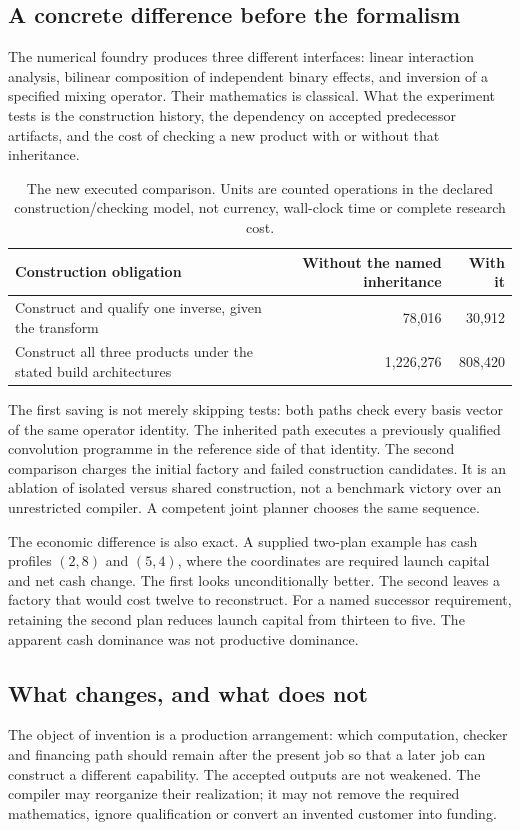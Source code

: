 \documentclass[11pt,letterpaper]{article}
\theoremstyle{definition}\newtheorem{definition}[theorem]{Definition}
\theoremstyle{remark}\newtheorem{remark}[theorem]{Remark}
\begin{document}
\subsection{A concrete difference before the formalism}
The numerical foundry produces three different interfaces: linear interaction analysis, bilinear composition of independent binary effects, and inversion of a specified mixing operator. Their mathematics is classical. What the experiment tests is the construction history, the dependency on accepted predecessor artifacts, and the cost of checking a new product with or without that inheritance.

\begin{table}[htbp]\centering\small
\caption{The new executed comparison. Units are counted operations in the declared construction/checking model, not currency, wall-clock time or complete research cost.}
\begin{tabularx}{\linewidth}{@{}Yrr@{}}\toprule
Construction obligation & Without the named inheritance & With it\\\midrule
Construct and qualify one inverse, given the transform & 78,016 & 30,912\\
Construct all three products under the stated build architectures & 1,226,276 & 808,420\\\bottomrule
\end{tabularx}
\label{tab:opening}
\end{table}

The first saving is not merely skipping tests: both paths check every basis vector of the same operator identity. The inherited path executes a previously qualified convolution programme in the reference side of that identity. The second comparison charges the initial factory and failed construction candidates. It is an ablation of isolated versus shared construction, not a benchmark victory over an unrestricted compiler. A competent joint planner chooses the same sequence.

The economic difference is also exact. A supplied two-plan example has cash profiles $(2,8)$ and $(5,4)$, where the coordinates are required launch capital and net cash change. The first looks unconditionally better. The second leaves a factory that would cost twelve to reconstruct. For a named successor requirement, retaining the second plan reduces launch capital from thirteen to five. The apparent cash dominance was not productive dominance.

\subsection{What changes, and what does not}
The object of invention is a production arrangement: which computation, checker and financing path should remain after the present job so that a later job can construct a different capability. The accepted outputs are not weakened. The compiler may reorganize their realization; it may not remove the required mathematics, ignore qualification or convert an invented customer into funding.
\end{document}
